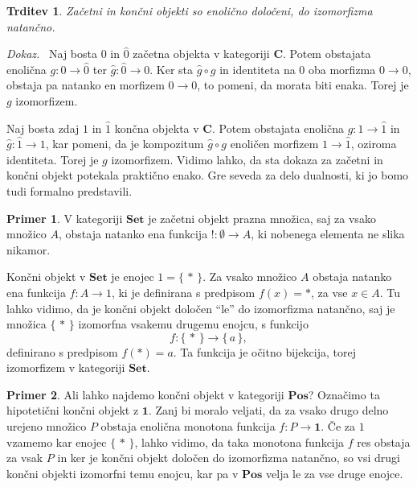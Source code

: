 \documentclass[12pt,a4paper]{book}
\theoremstyle{definition}
\theoremstyle{plain}
\newtheorem{trditev}[definicija]{Trditev}
\newenvironment{dokaz}{\emph{Dokaz.}\ }{\hspace{\fill}{$\Box$}}
\theoremstyle{definition}
\newtheorem{primer}{Primer}[section]
\theoremstyle{remark}
\newcommand{\cat}[1]{\textbf{#1}}
\renewcommand{\set}[1]{\{\,#1\,\}}
\begin{document}
\begin{trditev}
Začetni in končni objekti so enolično določeni, do izomorfizma natančno.
\end{trditev}
\begin{dokaz}
Naj bosta $0$ in $\hat{0}$ začetna objekta v kategoriji $\cat{C}$. Potem obstajata enolična $g : 0 \to \hat{0}$ ter $\hat{g} : \hat{0} \to 0$. Ker sta $\hat{g} \circ g$ in identiteta na $0$ oba morfizma $0 \to 0$, obstaja pa natanko en morfizem $0 \to 0$, to pomeni, da morata biti enaka. Torej je $g$ izomorfizem.

Naj bosta zdaj $1$ in $\hat{1}$ končna objekta v $\cat{C}$. Potem obstajata enolična $g : 1 \to \hat{1}$ in $\hat{g} : \hat{1} \to 1$, kar pomeni, da je kompozitum $\hat{g} \circ g$ enoličen morfizem $1 \to \hat{1}$, oziroma identiteta. Torej je $g$ izomorfizem.
\end{dokaz}
Vidimo lahko, da sta dokaza za začetni in končni objekt potekala praktično enako. Gre seveda za delo dualnosti, ki jo bomo tudi formalno predstavili.

\begin{primer}
V kategoriji $\cat{Set}$ je začetni objekt prazna množica, saj za vsako množico $A$, obstaja natanko ena funkcija $! : \emptyset \to A$, ki nobenega elementa ne slika nikamor. 

Končni objekt v $\cat{Set}$ je enojec $1 = \set{*}$. Za vsako množico $A$ obstaja natanko ena funkcija $f : A \to 1$, ki je definirana s predpisom $f(x) = *$, za vse $x \in A$. Tu lahko vidimo, da je končni objekt določen "`le"' do izomorfizma natančno, saj je množica $\set{*}$ izomorfna vsakemu drugemu enojcu, s funkcijo 
$$f : \set{*} \to \set{a},$$
definirano s predpisom $f(*) = a$. Ta funkcija je očitno bijekcija, torej izomorfizem v kategoriji $\cat{Set}$.
\end{primer}


\begin{primer}
Ali lahko najdemo končni objekt v kategoriji $\cat{Pos}$? Označimo ta hipotetični končni objekt z $\textbf{1}$. Zanj bi moralo veljati, da za vsako drugo delno urejeno množico $P$ obstaja enolična monotona funkcija $f : P \to \textbf{1}$. Če za $1$ vzamemo kar enojec $\set{*}$, lahko vidimo, da taka monotona funkcija $f$ res obstaja za vsak $P$ in ker je končni objekt določen do izomorfizma natančno, so vsi drugi končni objekti izomorfni temu enojcu, kar pa v $\cat{Pos}$ velja le za vse druge enojce.
\end{primer}
\end{document}
